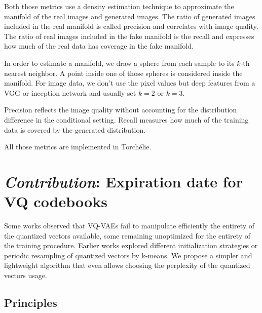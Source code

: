 Both those metrics use a density estimation technique to approximate the manifold of the real images and generated images. The ratio of generated images included in the real manifold is called precision and correlates with image quality. The ratio of real images included in the fake manifold is the recall and expresses how much of the real data has coverage in the fake manifold.

In order to estimate a manifold, we draw a sphere from each sample to its $k$-th nearest neighbor. A point inside one of those spheres is considered inside the manifold. For image data, we don't use the pixel values but deep features from a VGG or inception network and usually set $k=2$ or $k=3$.

Precision reflects the image quality without accounting for the distribution difference in the conditional setting. Recall measures how much of the training data is covered by the generated distribution.

All those metrics are implemented in Torchélie.

\section{\emph{\arr Contribution}: Expiration date for VQ codebooks}

Some works \cite{robustvq} observed that VQ-VAEs fail to manipulate efficiently the entirety of the quantized vectors available, some remaining unoptimized for the entirety of the training procedure. Earlier works explored different initialization strategies or periodic resampling of quantized vectors by k-means. We propose a simpler and lightweight algorithm that even allows choosing the perplexity of the quantized vectors usage.

\subsection{Principles}

